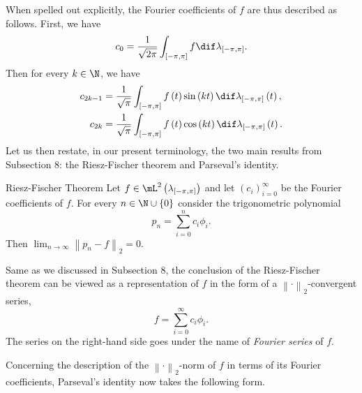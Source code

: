 \documentclass[pmath450]{subfiles}
\begin{document}
    \np When spelled out explicitly, the Fourier coefficients of $f$ are thus described as follows. First, we have
    \begin{equation*}
        c_0 = \frac{1}{\sqrt{2\pi}}\int_{\left[ -\pi,\pi \right]}f\dif\lambda_{\left[ -\pi,\pi \right]}.
    \end{equation*}
    Then for every $k\in\N$, we have
    \begin{equation*}
        \begin{aligned}
            c_{2k-1} & = \frac{1}{\sqrt{\pi}} \int_{\left[ -\pi,\pi \right]}f\left( t \right)\sin\left( kt \right)\dif\lambda_{\left[ -\pi,\pi \right]}\left( t \right) , \\
            c_{2k} & = \frac{1}{\sqrt{\pi}} \int_{\left[ -\pi,\pi \right]}f\left( t \right)\cos\left( kt \right)\dif\lambda_{\left[ -\pi,\pi \right]}\left( t \right) .
        \end{aligned} 
    \end{equation*}
    Let us then restate, in our present terminology, the two main results from Subsection 8: the Riesz-Fischer theorem and Parseval's identity.

    \begin{prop}{Riesz-Fischer Theorem}
        Let $f\in\mL^{2}\left( \lambda_{\left[ -\pi,\pi \right]} \right)$ and let $\left( c_{i} \right)^{\infty}_{i=0}$ be the Fourier coefficients of $f$. For every $n\in\N\cup\left\lbrace 0 \right\rbrace$ consider the trigonometric polynomial
        \begin{equation*}
            p_n = \sum^{n}_{i=0}c_i\phi_i.
        \end{equation*}
        Then $\lim_{n\to\infty} \left\lVert p_n-f \right\rVert_{2} = 0$.
    \end{prop}


    \np Same as we discussed in Subsection 8, the conclusion of the Riesz-Fischer theorem can  be viewed as a representation of $f$ in the form of a $\left\lVert \cdot \right\rVert_{2}$-convergent series,
    \begin{equation*}
        f = \sum^{\infty}_{i=0} c_i\phi_i.
    \end{equation*}
    The series on the right-hand side goes under the name of \textit{Fourier series} of $f$.

    Concerning the description of the $\left\lVert \cdot \right\rVert_{2}$-norm of $f$ in terms of its Fourier coefficients, Parseval's identity now takes the following form.
\end{document}

